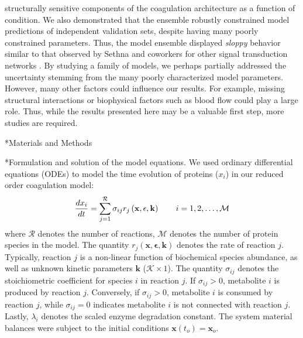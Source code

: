 \documentclass[12pt]{article}
\makeatletter
\renewcommand\subsection{\@startsection
	{subsection}{2}{0mm}
	{-0.05in}
	{-0.5\baselineskip}
	{\normalfont\normalsize\bfseries}}
\renewcommand\section{\@startsection
	{subsection}{2}{0mm}
	{-0.2in}
	{0.05\baselineskip}
	{\normalfont\large\bfseries}}
\makeatother
\begin{document}
structurally sensitive components of the coagulation architecture as a function of condition.
We also demonstrated that the ensemble robustly constrained model predictions of independent validation sets, despite having many poorly constrained parameters.
Thus, the model ensemble displayed \emph{sloppy} behavior similar to that observed by Sethna and coworkers for other signal transduction networks \cite{Gutenkunst2007}.  
By studying a family of models, we perhaps partially addressed the uncertainty stemming from the many poorly characterized model parameters.
However, many other factors could influence our results. For example, missing structural interactions or biophysical factors such as blood flow could play a large role.
Thus, while the results presented here may be a valuable first step, more studies are required.

\clearpage

\section*{Materials and Methods}

\subsection*{Formulation and solution of the model equations.}
We used ordinary differential equations (ODEs) to model the time evolution of proteins ($x_{i}$) in our reduced order coagulation model:
\begin{equation}
	\frac{dx_{i}}{dt}  =  \sum_{j = 1}^{\mathcal{R}}\sigma_{ij}r_{j}\left(\mathbf{x},\mathbf{\epsilon},\mathbf{k}\right)\qquad{i=1,2,\hdots,\mathcal{M}}\\
\end{equation}
where $\mathcal{R}$ denotes the number of reactions, $\mathcal{M}$ denotes the number of protein species in the model. 
The quantity $r_{j}\left(\mathbf{x},\mathbf{\epsilon},\mathbf{k}\right)$ denotes the rate of reaction $j$. 
Typically, reaction $j$ is a non-linear function of biochemical species abundance, as well as unknown kinetic parameters $\mathbf{k}$ ($\mathcal{K}\times{1}$). 
The quantity $\sigma_{ij}$ denotes the stoichiometric coefficient for species $i$ in reaction $j$. 
If $\sigma_{ij}>0$, metabolite $i$ is produced by reaction $j$. 
Conversely, if $\sigma_{ij}>0$, metabolite $i$ is consumed by reaction $j$, while $\sigma_{ij} = 0$ indicates metabolite $i$ is not connected with reaction $j$. 
Lastly, $\lambda_{i}$ denotes the scaled enzyme degradation constant. 
The system material balances were subject to the initial conditions $\mathbf{x}\left(t_{o}\right) = \mathbf{x}_{o}$. 
\end{document}
